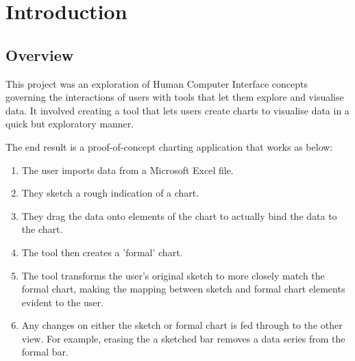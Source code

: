 \chapter{Introduction}
\section{Overview}
This project was an exploration of Human Computer Interface concepts governing the interactions of users with tools that let them explore and visualise data. It involved creating a tool that lets users create charts to visualise data in a quick but exploratory manner. 

The end result is a proof-of-concept charting application that works as below:
\begin{enumerate}
\item The user imports data from a Microsoft Excel file.
\item They sketch a rough indication of a chart.
\item They drag the data onto elements of the chart to actually bind the data to the chart. 
\item The tool then creates a 'formal' chart.
\item The tool transforms the user's original sketch to more closely match the formal chart, making the mapping between sketch and formal chart elements evident to the user.
\item Any changes on either the sketch or formal chart is fed through to the other view. For example, erasing the a sketched bar removes a data series from the formal bar.
\end{enumerate}